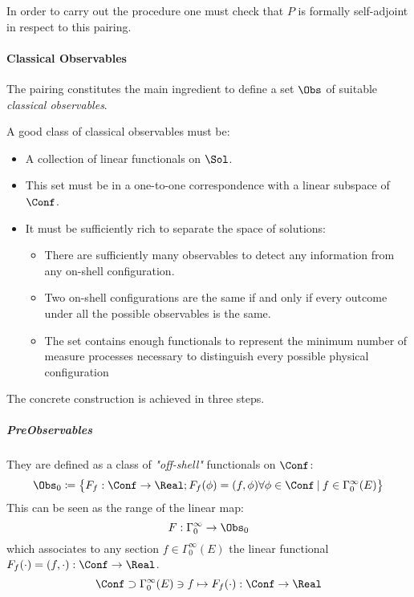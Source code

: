 \documentclass[Main]{subfiles}
\begin{document}
   				In order to carry out the procedure one must check that $P$ is formally self-adjoint in respect to this pairing.

   					
   		\paragraph{Classical Observables}
   		The pairing constitutes the main ingredient to define a set $\Obs$ of suitable \emph{classical observables}.
   		\begin{remark}
   			A good class of classical observables must be:
   			\begin{itemize}
   				\item A collection of  linear functionals on $\Sol$.
   				\item This set must be in a one-to-one correspondence  with a linear subspace of $\Conf$.
   				\item It must be sufficiently rich to separate the space of solutions:
   					\begin{itemize}
   						\item There are sufficiently many observables to detect any information from any on-shell configuration.
   						\item Two on-shell configurations are the same if and only if every outcome under all the possible observables is the same.
   						\item The set contains enough functionals to represent the minimum number of measure processes necessary to distinguish every possible physical configuration
   					\end{itemize}
   			\end{itemize}
   		\end{remark}
   		The concrete construction is achieved in three steps.
   		
 			\subparagraph{PreObservables}
 				They are defined as a class of \emph{"off-shell"} functionals on $\Conf$:
   							\begin{displaymath}
   								\Obs_0 \coloneqq \big\{ F_f: \Conf \rightarrow \Real ;  F_f(\phi)=( f, \phi) \forall \phi \in \Conf \:\vert
   								\:  f \in \Gamma_0^\infty(E)	\big\}
   							\end{displaymath}
   				This can be seen as the range of the linear map:
   				\begin{displaymath}
   					F: \Gamma_0^\infty \rightarrow \Obs_0
  	 			\end{displaymath}
   				which associates to any section $f\in \Gamma_0^\infty(E)$ the linear functional 
   				$F_f(\cdot) = (f,\cdot) :\Conf \rightarrow \Real$.
  	 			\begin{displaymath}
   					\Conf 	\supset \Gamma^\infty_0(E) \ni f \mapsto F_f(\cdot):\Conf \rightarrow \Real
   				\end{displaymath}			
			
\end{document}
